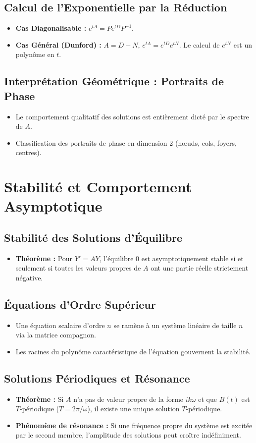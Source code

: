 \documentclass[12pt, a4paper, parskip=full]{report}
\theoremstyle{agregstyle}
\begin{document}
\subsection{Calcul de l'Exponentielle par la Réduction}
\begin{itemize}
    \item \textbf{Cas Diagonalisable :} $e^{tA}=Pe^{tD}P^{-1}$.
    \item \textbf{Cas Général (Dunford) :} $A=D+N$, $e^{tA}=e^{tD}e^{tN}$. Le calcul de $e^{tN}$ est un polynôme en $t$.
\end{itemize}
\subsection{Interprétation Géométrique : Portraits de Phase}
\begin{itemize}
    \item Le comportement qualitatif des solutions est entièrement dicté par le spectre de $A$.
    \item Classification des portraits de phase en dimension 2 (nœuds, cols, foyers, centres).
\end{itemize}

\section{Stabilité et Comportement Asymptotique}
\subsection{Stabilité des Solutions d'Équilibre}
\begin{itemize}
    \item \textbf{Théorème :} Pour $Y'=AY$, l'équilibre 0 est asymptotiquement stable si et seulement si toutes les valeurs propres de $A$ ont une partie réelle strictement négative.
\end{itemize}
\subsection{Équations d'Ordre Supérieur}
\begin{itemize}
    \item Une équation scalaire d'ordre $n$ se ramène à un système linéaire de taille $n$ via la matrice compagnon.
    \item Les racines du polynôme caractéristique de l'équation gouvernent la stabilité.
\end{itemize}
\subsection{Solutions Périodiques et Résonance}
\begin{itemize}
    \item \textbf{Théorème :} Si $A$ n'a pas de valeur propre de la forme $ik\omega$ et que $B(t)$ est $T$-périodique ($T=2\pi/\omega$), il existe une unique solution $T$-périodique.
    \item \textbf{Phénomène de résonance :} Si une fréquence propre du système est excitée par le second membre, l'amplitude des solutions peut croître indéfiniment.
\end{itemize}
\end{document}
